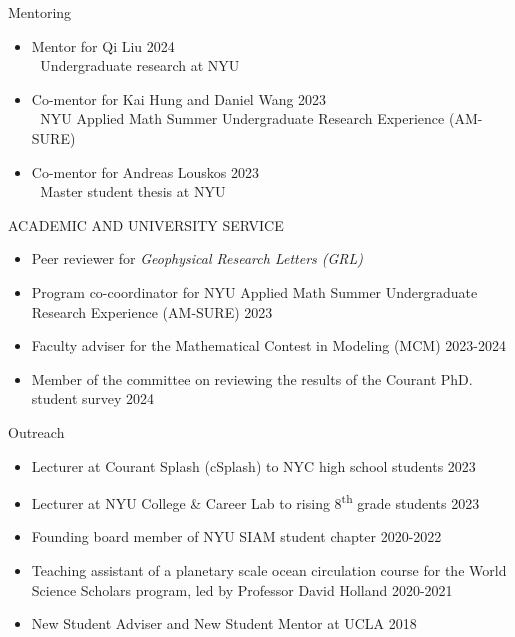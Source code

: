 \documentclass{resume} %
\begin{document}
\begin{rSection}{Mentoring}
\begin{itemize}
    \itemsep -0.3em
    \item Mentor for Qi Liu \hfill 2024\\
    $\left.\;\right.$ Undergraduate research at NYU
    \item Co-mentor for Kai Hung and Daniel Wang \hfill 2023 \\
    $\left.\;\right.$ NYU Applied Math Summer Undergraduate Research Experience (AM-SURE)
    \item Co-mentor for Andreas Louskos  \hfill 2023\\
    $\left.\;\right.$ Master student thesis at NYU
\end{itemize}
\end{rSection}


\begin{rSection}{ACADEMIC AND UNIVERSITY SERVICE}
\begin{itemize}
    \itemsep -0.3em
    \item Peer reviewer for \textit{Geophysical Research Letters (GRL)}
    \item Program co-coordinator for NYU Applied Math Summer Undergraduate Research Experience (AM-SURE) \hfill 2023
    \item Faculty adviser for the Mathematical Contest in Modeling (MCM) \hfill 2023-2024
    \item Member of the committee on reviewing the results of the Courant PhD. student survey \hfill 2024
\end{itemize}
\end{rSection}

\begin{rSection}{Outreach}
\begin{itemize}
    \itemsep -0.3em
    \item Lecturer at Courant Splash (cSplash) to NYC high school students \hfill 2023
    \item Lecturer at NYU College \& Career Lab to rising 8\textsuperscript{th} grade students \hfill 2023
    \item Founding board member of NYU SIAM student chapter \hfill 2020-2022
    \item Teaching assistant of a planetary scale ocean circulation course for the World Science Scholars program, led by Professor David Holland \hfill 2020-2021
    \item New Student Adviser and New Student Mentor at UCLA \hfill 2018
\end{itemize}
\end{rSection}
\end{document}
